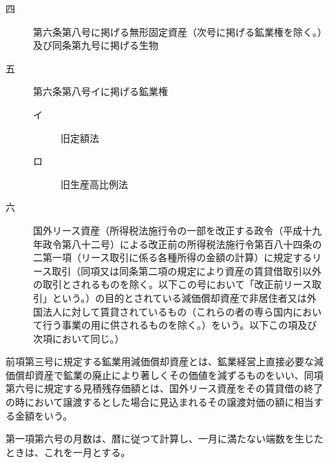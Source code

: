 \documentclass[twocolumn,a4j,10pt]{ltjtarticle}
\begin{document}
\begin{description}
\begin{description}
\begin{description}
\end{description}
\item[四]第六条第八号に掲げる無形固定資産（次号に掲げる鉱業権を除く。）及び同条第九号に掲げる生物
\item[五]第六条第八号イに掲げる鉱業権
\begin{description}
\item[イ]旧定額法
\item[ロ]旧生産高比例法
\end{description}
\item[六]国外リース資産（所得税法施行令の一部を改正する政令（平成十九年政令第八十二号）による改正前の所得税法施行令第百八十四条の二第一項（リース取引に係る各種所得の金額の計算）に規定するリース取引（同項又は同条第二項の規定により資産の賃貸借取引以外の取引とされるものを除く。以下この号において「改正前リース取引」という。）の目的とされている減価償却資産で非居住者又は外国法人に対して賃貸されているもの（これらの者の専ら国内において行う事業の用に供されるものを除く。）をいう。以下この項及び次項において同じ。）
\end{description}
\item[\rensuji{2}]前項第三号に規定する鉱業用減価償却資産とは、鉱業経営上直接必要な減価償却資産で鉱業の廃止により著しくその価値を減ずるものをいい、同項第六号に規定する見積残存価額とは、国外リース資産をその賃貸借の終了の時において譲渡するとした場合に見込まれるその譲渡対価の額に相当する金額をいう。
\item[\rensuji{3}]第一項第六号の月数は、暦に従つて計算し、一月に満たない端数を生じたときは、これを一月とする。
\end{description}
\end{document}
